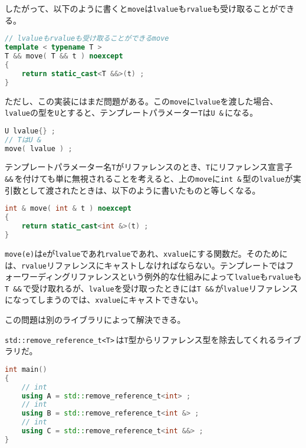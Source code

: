 したがって、以下のように書くと\texttt{move}は\texttt{lvalue}も\texttt{rvalue}も受け取ることができる。

\begin{lstlisting}[language={C++}]
// lvalueもrvalueも受け取ることができるmove
template < typename T >
T && move( T && t ) noexcept
{
    return static_cast<T &&>(t) ;
}
\end{lstlisting}

ただし、この実装にはまだ問題がある。この\texttt{move}に\texttt{lvalue}を渡した場合、\texttt{lvalue}の型を\texttt{U}とすると、テンプレートパラメーター\texttt{T}は\texttt{U \&}\,になる。

\begin{lstlisting}[language={C++}]
U lvalue{} ;
// TはU &
move( lvalue ) ;
\end{lstlisting}

テンプレートパラメーター名\texttt{T}がリファレンスのとき、\texttt{T}にリファレンス宣言子\,\texttt{\&\&}\,を付けても単に無視されることを考えると、上の\texttt{move}に\texttt{int \&}\,型の\texttt{lvalue}が実引数として渡されたときは、以下のように書いたものと等しくなる。

\begin{lstlisting}[language={C++}]
int & move( int & t ) noexcept
{
    return static_cast<int &>(t) ;
}
\end{lstlisting}

\texttt{move(e)}は\texttt{e}が\texttt{lvalue}であれ\texttt{rvalue}であれ、\texttt{xvalue}にする関数だ。そのためには、\texttt{rvalue}リファレンスにキャストしなければならない。テンプレートではフォーワーディングリファレンスという例外的な仕組みによって\texttt{lvalue}も\texttt{rvalue}も\texttt{T \&\&}\,で受け取れるが、\texttt{lvalue}を受け取ったときには\texttt{T \&\&}\,が\texttt{lvalue}リファレンスになってしまうのでは、\texttt{xvalue}にキャストできない。

この問題は別のライブラリによって解決できる。


\texttt{std::remove\_reference\_t<T>}\,は\texttt{T}型からリファレンス型を除去してくれるライブラリだ。

\begin{lstlisting}[language={C++}]
int main()
{
    // int
    using A = std::remove_reference_t<int> ;
    // int
    using B = std::remove_reference_t<int &> ;
    // int
    using C = std::remove_reference_t<int &&> ;
}
\end{lstlisting}

